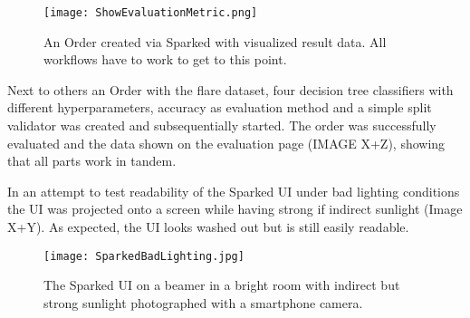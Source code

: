 \begin{figure}
	\texttt{[image: ShowEvaluationMetric.png]}
	\caption{An Order created via Sparked with visualized result data. All workflows have to work to get to this point.}
\end{figure}

Next to others an Order with the flare dataset, four decision tree classifiers with different hyperparameters, accuracy as evaluation method and a simple split validator was created and subsequentially started. The order was successfully evaluated and the data shown on the evaluation page (IMAGE X+Z), showing that all parts work in tandem. 

In an attempt to test readability of the Sparked UI under bad lighting conditions the UI was projected onto a screen while having strong if indirect sunlight (Image X+Y). As expected, the UI looks washed out but is still easily readable.

\begin{figure}
	\texttt{[image: SparkedBadLighting.jpg]}
	\caption{The Sparked UI on a beamer in a bright room with indirect but strong sunlight photographed with a smartphone camera.}
\end{figure}
